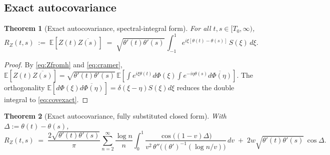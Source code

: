 \documentclass[11pt]{amsart}
\newtheorem{theorem}{Theorem}[section]
\theoremstyle{definition}
\begin{document}
\subsection{Exact autocovariance}

\begin{theorem}[Exact autocovariance, spectral-integral form]\label{thm:cov}
For all $t,s\in[T_{0},\infty)$,
\begin{equation}\label{eq:covexact}
R_{Z}(t,s) \;:=\; \mathbb{E}[Z(t)\overline{Z(s)}]
\;=\; \sqrt{\theta'(t)\theta'(s)}\,
\int_{-1}^{1}e^{i\xi[\theta(t)-\theta(s)]}\,S(\xi)\,d\xi.
\end{equation}
\end{theorem}

\begin{proof}
By \eqref{eq:Zfromh} and \eqref{eq:cramer},
$\mathbb{E}[Z(t)\overline{Z(s)}]=\sqrt{\theta'(t)\theta'(s)}\,\mathbb{E}\!\left[\int e^{i\xi\theta(t)}d\Phi(\xi)\int e^{-i\eta\theta(s)}\overline{d\Phi(\eta)}\right]$.
The orthogonality $\mathbb{E}[d\Phi(\xi)\overline{d\Phi(\eta)}]=\delta(\xi-\eta)S(\xi)d\xi$
reduces the double integral to \eqref{eq:covexact}.
\end{proof}

\begin{theorem}[Exact autocovariance, fully substituted closed form]\label{thm:covclosed}
With $\Delta := \theta(t)-\theta(s)$,
\begin{equation}\label{eq:covclosed}
R_{Z}(t,s) \;=\; \frac{2\sqrt{\theta'(t)\theta'(s)}}{\pi}\sum_{n=2}^{\infty}\frac{\log n}{n}\!\int_{0}^{1}\!\!\frac{\cos\!\bigl((1-v)\Delta\bigr)}{v^{2}\,\theta''\!\bigl((\theta')^{-1}(\log n/v)\bigr)}\,dv \;+\; 2w\sqrt{\theta'(t)\theta'(s)}\,\cos\Delta.
\end{equation}
\end{theorem}
\end{document}
